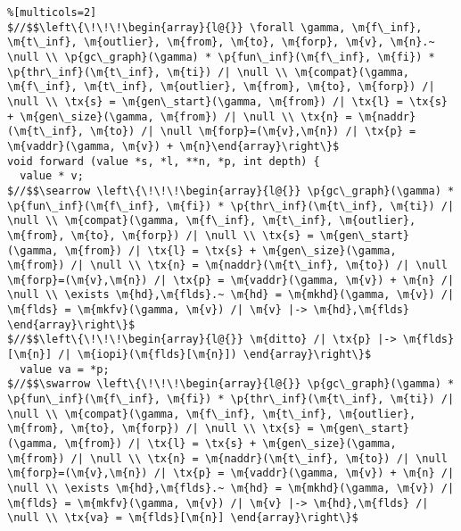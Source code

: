  
\begin{figure*}[!ht]
\vspace{-1ex}
  \begin{lstlisting}%[multicols=2]
$//$$\left\{\!\!\!\begin{array}{l@{}} \forall \gamma, \m{f\_inf}, \m{t\_inf}, \m{outlier}, \m{from}, \m{to}, \m{forp}, \m{v}, \m{n}.~ \null \\ \p{gc\_graph}(\gamma) * \p{fun\_inf}(\m{f\_inf}, \m{fi}) * \p{thr\_inf}(\m{t\_inf}, \m{ti}) /| \null \\ \m{compat}(\gamma, \m{f\_inf}, \m{t\_inf}, \m{outlier}, \m{from}, \m{to}, \m{forp}) /| \null \\ \tx{s} = \m{gen\_start}(\gamma, \m{from}) /| \tx{l} = \tx{s} + \m{gen\_size}(\gamma, \m{from}) /| \null \\ \tx{n} = \m{naddr}(\m{t\_inf}, \m{to}) /| \null \m{forp}=(\m{v},\m{n}) /| \tx{p} = \m{vaddr}(\gamma, \m{v}) + \m{n}\end{array}\right\}$
void forward (value *s, *l, **n, *p, int depth) {
  value * v;
$//$$\searrow \left\{\!\!\!\begin{array}{l@{}} \p{gc\_graph}(\gamma) * \p{fun\_inf}(\m{f\_inf}, \m{fi}) * \p{thr\_inf}(\m{t\_inf}, \m{ti}) /| \null \\ \m{compat}(\gamma, \m{f\_inf}, \m{t\_inf}, \m{outlier}, \m{from}, \m{to}, \m{forp}) /| \null \\ \tx{s} = \m{gen\_start}(\gamma, \m{from}) /| \tx{l} = \tx{s} + \m{gen\_size}(\gamma, \m{from}) /| \null \\ \tx{n} = \m{naddr}(\m{t\_inf}, \m{to}) /| \null \m{forp}=(\m{v},\m{n}) /| \tx{p} = \m{vaddr}(\gamma, \m{v}) + \m{n} /| \null \\ \exists \m{hd},\m{flds}.~ \m{hd} = \m{mkhd}(\gamma, \m{v}) /| \m{flds} = \m{mkfv}(\gamma, \m{v}) /| \m{v} |-> \m{hd},\m{flds} \end{array}\right\}$
$//$$\left\{\!\!\!\begin{array}{l@{}} \m{ditto} /| \tx{p} |-> \m{flds}[\m{n}] /| \m{iopi}(\m{flds}[\m{n}]) \end{array}\right\}$
  value va = *p; 
$//$$\swarrow \left\{\!\!\!\begin{array}{l@{}} \p{gc\_graph}(\gamma) * \p{fun\_inf}(\m{f\_inf}, \m{fi}) * \p{thr\_inf}(\m{t\_inf}, \m{ti}) /| \null \\ \m{compat}(\gamma, \m{f\_inf}, \m{t\_inf}, \m{outlier}, \m{from}, \m{to}, \m{forp}) /| \null \\ \tx{s} = \m{gen\_start}(\gamma, \m{from}) /| \tx{l} = \tx{s} + \m{gen\_size}(\gamma, \m{from}) /| \null \\ \tx{n} = \m{naddr}(\m{t\_inf}, \m{to}) /| \null \m{forp}=(\m{v},\m{n}) /| \tx{p} = \m{vaddr}(\gamma, \m{v}) + \m{n} /| \null \\ \exists \m{hd},\m{flds}.~ \m{hd} = \m{mkhd}(\gamma, \m{v}) /| \m{flds} = \m{mkfv}(\gamma, \m{v}) /| \m{v} |-> \m{hd},\m{flds} /| \null \\ \tx{va} = \m{flds}[\m{n}] \end{array}\right\}$

\end{lstlisting}
\end{figure*}
